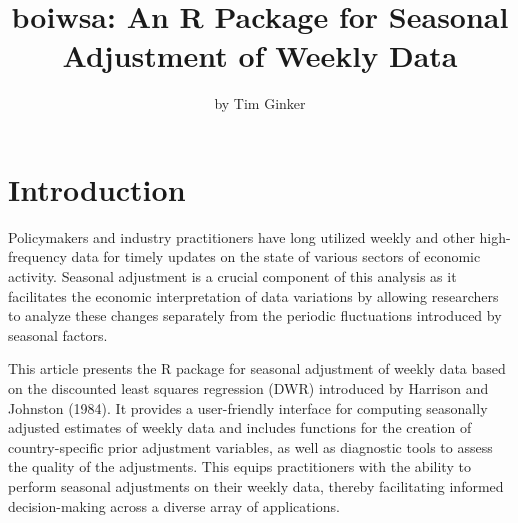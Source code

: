 \title{boiwsa: An R Package for Seasonal Adjustment of Weekly Data}


\author{by Tim Ginker}

\maketitle


\hypertarget{introduction}{%
\section{Introduction}\label{introduction}}

Policymakers and industry practitioners have long utilized weekly and other high-frequency data for timely updates on the state of various sectors of economic activity. Seasonal adjustment is a crucial component of this analysis as it facilitates the economic interpretation of data variations by allowing researchers to analyze these changes separately from the periodic fluctuations introduced by seasonal factors.

This article presents the R package  for seasonal adjustment of weekly data based on the discounted least squares regression (DWR) introduced by Harrison and Johnston (1984). It provides a user-friendly interface for computing seasonally adjusted estimates of weekly data and includes functions for the creation of country-specific prior adjustment variables, as well as diagnostic tools to assess the quality of the adjustments. This equips practitioners with the ability to perform seasonal adjustments on their weekly data, thereby facilitating informed decision-making across a diverse array of applications.


